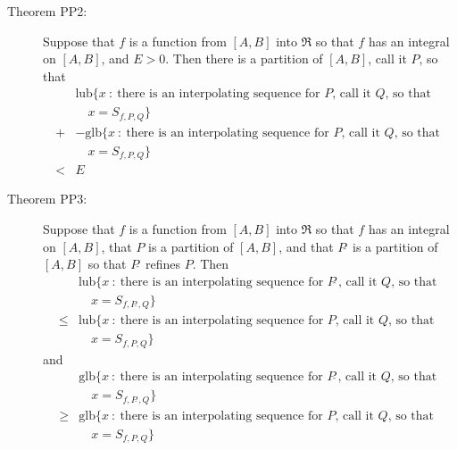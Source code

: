 \documentclass{article}
\begin{document}
\begin{description}
  \item[Theorem PP2:] Suppose that $f$ is a function from $[A,B]$ into $\Re$ so that $f$ has an integral on $[A,B]$, and $E > 0$. Then there is a partition of $[A,B]$, call it $P$, so that 
    \begin{align*}
    \ & \text{lub} \{ x\ :\  \text{there is an interpolating sequence for $P$, call it $Q$, so that } \\
      & \quad x = S_{f,P,Q} \} \\ 
    + & -\text{glb} \{ x\ :\ \text{there is an interpolating sequence for $P$, call it $Q$, so that } \\
      & \quad x = S_{f,P,Q} \} \\
    < & E
    \end{align*}

  \item[Theorem PP3:] Suppose that $f$ is a function from $[A,B]$ into $\Re$ so that $f$ has an integral on $[A,B]$, that $P$ is a partition of $[A,B]$, and that $P\hat{\ }$ is a partition of $[A,B]$ so that $P\hat{\ }$ refines $P$. Then 
    \begin{align*}
    \    & \text{lub} \{ x\ :\ \text{there is an interpolating sequence for $P\hat{\ }$, call it $Q$, so that } \\
         & \quad x = S_{f,P\hat{\ },Q} \} \\
    \leq & \text{lub} \{ x\ :\ \text{there is an interpolating sequence for $P$, call it $Q$, so that } \\
         & \quad x = S_{f,P,Q} \}
    \end{align*}
    and 
    \begin{align*}
    \    & \text{glb} \{ x\ :\ \text{there is an interpolating sequence for $P\hat{\ }$, call it $Q$, so that } \\
         & \quad x = S_{f,P\hat{\ },Q} \} \\
    \geq & \text{glb} \{ x\ :\ \text{there is an interpolating sequence for $P$, call it $Q$, so that } \\
         & \quad x = S_{f,P,Q} \}
    \end{align*}


\end{description}
\end{document}
